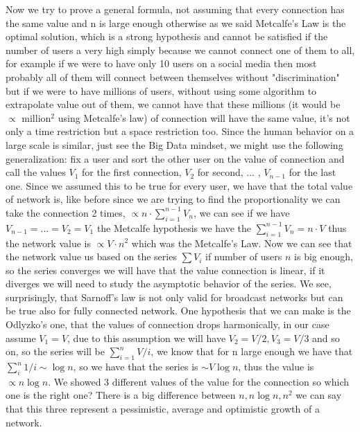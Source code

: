 \documentclass[12pt, a4page]{article}
\begin{document}
Now we try to prove a general formula, not assuming that every connection has the same value and n is large enough otherwise as we said Metcalfe's Law is the optimal solution, which is a strong hypothesis and cannot be satisfied if the number of users a very high simply because we cannot connect one of them to all, for example if we were to have only 10 users on a social media then most probably all of them will connect between themselves without "discrimination" but if we were to have millions of users, without using some algorithm to extrapolate value out of them, we cannot have that these millions (it would be $\propto$ million$^2$ using Metcalfe's law) of connection will have the same value, it's not only a time restriction but a space restriction too. Since the human behavior on a large scale is similar, just see the Big Data mindset, we might use the following generalization:
fix a user and sort the other user on the value of connection and call the values $V_1$ for the first connection, $V_2$ for second, ... , $V_{n-1}$ for the last one.
\newline
Since we assumed this to be true for every user, we have that the total value of network is, like before since we are trying to find the proportionality we can take the connection 2 times, $\propto n \cdot \sum_{i=1}^{n-1} V_n$, we can see if we have $V_{n-1}=...=V_2=V_1$ the Metcalfe hypothesis we have the $ \sum_{i=1}^{n-1} V_n = n\cdot V$ thus the network value is $\propto V \cdot n^2$ which was the Metcalfe's Law.
Now we can see that the network value us based on the series $\sum V_i$ if number of users $n$ is big enough, so the series converges we will have that the value connection is linear, if it diverges we will need to study the asymptotic behavior of the series.
We see, surprisingly, that Sarnoff's law is not only valid for broadcast networks but can be true also for fully connected network.\newline
One hypothesis that we can make is the Odlyzko's one, that the values of connection drops harmonically, in our case assume $V_1 = V$, due to this assumption we will have $V_2 = V/2, V_3 = V/3$ and so on, so the series will be $\sum_{i=1}^n V/i$, we know that for n large enough we have that $\sum_i^n 1/i \sim \log n$, so we have that the series is $\sim V \log n$, thus the value is $\propto n \log n$.\newline
We showed 3 different values of the value for the connection so which one is the right one? There is a big difference between $n, n\log n, n^2$ we can say that this three represent a pessimistic, average and optimistic growth of a network.
\end{document}
